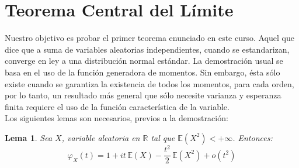 \documentclass[a4paper]{article}
\newtheorem{lem}{Lema}
\numberwithin{equation}{subsection}
\numberwithin{definicion}{subsection}
\def\R{\mathbb R}
\def\E{\mathbb E}
\begin{document}
\section{Teorema Central del Límite}
Nuestro objetivo es probar el primer teorema enunciado en este curso. Aquel que dice que a suma de variables aleatorias independientes, cuando se estandarizan, converge en ley a una distribución normal estándar. La demostración usual se basa en el uso de la función generadora de momentos. Sin embargo, ésta sólo existe cuando se garantiza la existencia de todos los momentos, para cada orden, por lo tanto, un resultado más general que sólo necesite varianza y esperanza finita requiere el uso de la función característica de la variable.\\ \newline
Los siguientes lemas son necesarios, previos a la demostración:

\begin{lem} Sea $X$, variable aleatoria en $\R$ tal que $\E(X^2) < +\infty$. Entonces:
\[\varphi_X(t) = 1 + it\,\E(X) - \frac{t^2}{2}\,\E(X^2) + o(t^2)\]
\end{lem}
\end{document}
